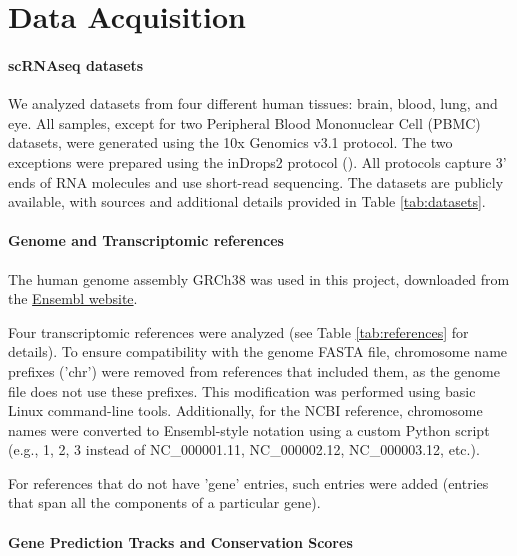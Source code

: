 \section{Data Acquisition}

\paragraph{\textbf{scRNAseq datasets}}

We analyzed datasets from four different human tissues: brain, blood, lung, and eye.
All samples, except for two Peripheral Blood Mononuclear Cell (PBMC) datasets,
were generated using the 10x Genomics v3.1 protocol.
The two exceptions were prepared using the inDrops2 protocol (\cite{Juzenas2025}).
All protocols capture 3' ends of RNA molecules and use short-read sequencing.
The datasets are publicly available, with sources and additional details provided in Table \ref{tab:datasets}.



\paragraph{\textbf{Genome and Transcriptomic references}}

The human genome assembly GRCh38 was used in this project, downloaded from the \href{https://ftp.ensembl.org/pub/release-113/fasta/homo_sapiens/dna/}{Ensembl website}.

Four transcriptomic references were analyzed (see Table \ref{tab:references} for details).
To ensure compatibility with the genome FASTA file, chromosome name prefixes ('chr') were removed from references that included them,
as the genome file does not use these prefixes.
This modification was performed using basic Linux command-line tools.
Additionally, for the NCBI reference, chromosome names were converted to Ensembl-style notation using a custom Python script
(e.g., 1, 2, 3 instead of NC\_000001.11, NC\_000002.12, NC\_000003.12, etc.).

For references that do not have 'gene' entries, such entries were added
(entries that span all the components of a particular gene).



\paragraph{\textbf{Gene Prediction Tracks and Conservation Scores}}

